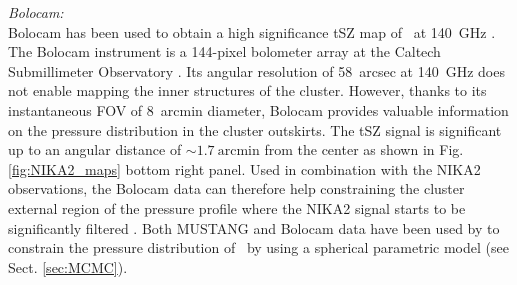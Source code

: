 \documentclass[traditabstract]{aa}
\begin{document}
\noindent\emph{Bolocam:}\\
Bolocam has been used to obtain a high significance tSZ map of \psz\ at 140~GHz \citep{say13,cza15}. The Bolocam instrument is a 144-pixel bolometer array at the Caltech Submillimeter Observatory \citep[see][for more details on the Bolocam instrument]{hai04}. Its angular resolution of 58~arcsec at 140~GHz does not enable mapping the inner structures of the cluster. However, thanks to its instantaneous FOV of 8~arcmin diameter, Bolocam provides valuable information on the pressure distribution in the cluster outskirts. The tSZ signal is significant up to an angular distance of ${\sim}1.7~\mathrm{arcmin}$ from the center as shown in Fig. \ref{fig:NIKA2_maps} bottom right panel. Used in combination with the NIKA2 observations, the Bolocam data can therefore help constraining the cluster external region of the pressure profile where the NIKA2 signal starts to be significantly filtered \citep[see \emph{e.g.}][]{rom17}. Both MUSTANG and Bolocam data have been used by \cite{you15} to constrain the pressure distribution of \psz\ by using a spherical parametric model (see Sect. \ref{sec:MCMC}).\\
\end{document}
